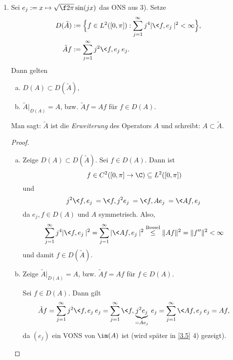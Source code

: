 \begin{ex}
\begin{enumerate}[1)]
\begin{proof}
				Da $A$ symmetrisch (also die Eigenfunktionen $e_j$ orthogonal) und
				\[
					\|e_j\|^2 = \int_0^\pi \f 2\pi \sin^2(x) \dx = \f 1\pi \int_0^\pi 1 - \cos(2x) \dx = 1,
				\]
				bilden die $(e_j)$ ein ONS.
			\end{proof}
		\item
			Sei $e_j := x \mapsto \sqrt{\f 2\pi} \sin(jx)$ das ONS aus 3).
			Setze
			\begin{align*}
				D(\tilde A) &:= \Big\{ f\in L^2([0,\pi]) : \sum_{j=1}^\infty j^4 |\<f,e_j\>|^2 < \infty \Big\}, \\
				\tilde A f &:= \sum_{j=1}^\infty j^2 \<f, e_j \> e_j.
			\end{align*}
			Dann gelten
			\begin{enumerate}[a)]
				\item
					$D(A) \subset D(\tilde A)$,
				\item
					$\tilde A \Big|_{D(A)} = A$, bzw. $\tilde Af = Af$ für $f \in D(A)$.
			\end{enumerate}
			Man sagt: $\tilde A$ ist die \emph{Erweiterung} des Operators $A$ und schreibt: $A \subset \tilde A$.
			\begin{proof}
				\begin{enumerate}[a)]
					\item
						Zeige $D(A) \subset D(\tilde A)$.
						Sei $f \in D(A)$. Dann ist
						\[
							f \in C^2([0,\pi]\to \C) \subset L^2([0,\pi])
						\]
						und
						\[
							j^2\<f,e_j\> = \<f,j^2e_j\> = \<f,Ae_j\>= \<Af, e_j\>	
						\]
						da $e_j, f \in D(A)$ und $A$ symmetrisch.
						Also,
						\[
							\sum_{j=1}^\infty j^4|\<f,e_j\>|^2 
							= \sum_{j=1}^\infty |\<Af,e_j\>|^2 
							\stackrel{\text{Bessel}}\le \|Af\|^2 
							= \|f''\|^2
							< \infty
						\]
						und damit $f \in D(\tilde A)$.
					\item
						Zeige $\tilde A \Big|_{D(A)} = A$, bzw. $\tilde Af = Af$ für $f \in D(A)$.

						Sei $f \in D(A)$. Dann gilt
						\begin{align*}
							\tilde Af = \sum_{j=1}^\infty j^2 \<f,e_j\> e_j = \sum_{j=1}^\infty \<f,\underbrace{j^2e_j}_{=Ae_j}\> e_j = \sum_{j=1}^\infty \<Af, e_j\> e_j= Af,
						\end{align*}
						da $(e_j)$ ein VONS von $\im(A)$ ist (wird später in \ref{3.5} 4) gezeigt).
				\end{enumerate}
			\end{proof}
	\end{enumerate}
\end{ex}

